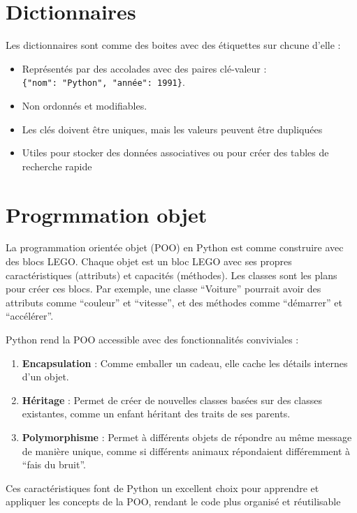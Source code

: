 \documentclass[
  letterpaper,
  DIV=11,
  numbers=noendperiod]{scrreprt}
\begin{document}
\section{Dictionnaires}\label{dictionnaires}

Les dictionnaires sont comme des boites avec des étiquettes sur chcune
d'elle :

\begin{itemize}
\item
  Représentés par des accolades avec des paires clé-valeur :
  \texttt{\{"nom":\ "Python",\ "année":\ 1991\}}.
\item
  Non ordonnés et modifiables.
\item
  Les clés doivent être uniques, mais les valeurs peuvent être
  dupliquées
\item
  Utiles pour stocker des données associatives ou pour créer des tables
  de recherche rapide
\end{itemize}

\section{Progrmmation objet}\label{progrmmation-objet}

La programmation orientée objet (POO) en Python est comme construire
avec des blocs LEGO. Chaque objet est un bloc LEGO avec ses propres
caractéristiques (attributs) et capacités (méthodes). Les classes sont
les plans pour créer ces blocs. Par exemple, une classe ``Voiture''
pourrait avoir des attributs comme ``couleur'' et ``vitesse'', et des
méthodes comme ``démarrer'' et ``accélérer''.

Python rend la POO accessible avec des fonctionnalités conviviales :

\begin{enumerate}
\def\labelenumi{\arabic{enumi}.}
\item
  \textbf{Encapsulation} : Comme emballer un cadeau, elle cache les
  détails internes d'un objet.
\item
  \textbf{Héritage} : Permet de créer de nouvelles classes basées sur
  des classes existantes, comme un enfant héritant des traits de ses
  parents.
\item
  \textbf{Polymorphisme} : Permet à différents objets de répondre au
  même message de manière unique, comme si différents animaux
  répondaient différemment à ``fais du bruit''.
\end{enumerate}

Ces caractéristiques font de Python un excellent choix pour apprendre et
appliquer les concepts de la POO, rendant le code plus organisé et
réutilisable
\end{document}
